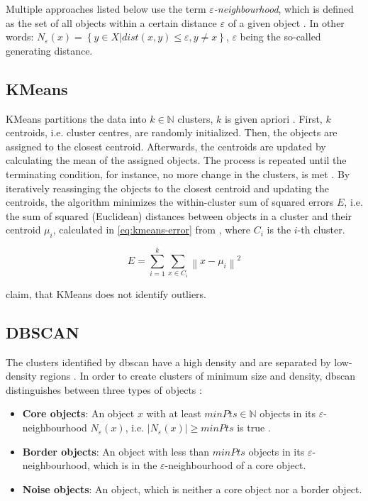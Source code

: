 Multiple approaches listed below use the term \textit{$\varepsilon$-neighbourhood}, which is defined as the set of all objects within a certain distance $\varepsilon$ of a given object \cite{OPTICS2013}.
In other words: $N_\varepsilon (x) = \left\{ y \in X | dist(x,y) \le \varepsilon, y \neq x \right\}$, $\varepsilon$ being the so-called generating distance.


\subsection{KMeans}\label{subsec:kmeans}

KMeans partitions the data into $k \in \mathbb{N}$  clusters, $k$ is given apriori \cite{OPTICS_kMeans_2016,clusteringDocs2020}. %
First, $k$ centroids, i.e. cluster centres, are randomly initialized.
Then, the objects are assigned to the closest centroid.
Afterwards, the centroids are updated by calculating the mean of the assigned objects.
The process is repeated until the terminating condition, for instance, no more change in the clusters, is met \cite{OPTICS_kMeans_2016}.
By iteratively reassinging the objects to the closest centroid and updating the centroids, 
the algorithm minimizes the within-cluster sum of squared errors $E$, i.e. the sum of squared (Euclidean) distances between objects in a cluster and their centroid $\mu_{i}$, 
calculated in \autoref{eq:kmeans-error} from \cite{OPTICS_kMeans_2016}, 
where $C_{i}$ is the $i$-th cluster.

\begin{equation}
    E = \sum_{i=1}^{k} \sum_{x \in C_{i}}\left\|x-\mu_{i}\right\|^{2}
\label{eq:kmeans-error}
\end{equation}

\citeauthor{OPTICS_kMeans_2016} claim, that KMeans does not identify outliers.


\subsection{DBSCAN}\label{subsec:dbscan}

The clusters identified by \ac{dbscan} have a high density and are separated by low-density regions \cite{OPTICS_kMeans_2016}.
In order to create clusters of minimum size and density, \ac{dbscan} distinguishes between three types of objects \cite{OPTICS_kMeans_2016}:

\begin{itemize}
    \item \textbf{Core objects}: 
    An object $x$ with at least $minPts \in \mathbb{N}$ objects in its $\varepsilon$-neighbourhood $N_\varepsilon(x)$, i.e. $| N_\varepsilon (x) | \geq minPts$ is true \cite{OPTICS2013}.

    \item \textbf{Border objects}: 
    An object with less than $minPts$ objects in its $\varepsilon$-neighbourhood, which is in the $\varepsilon$-neighbourhood of a core object.

    \item \textbf{Noise objects}: 
    An object, which is neither a core object nor a border object.
\end{itemize}

